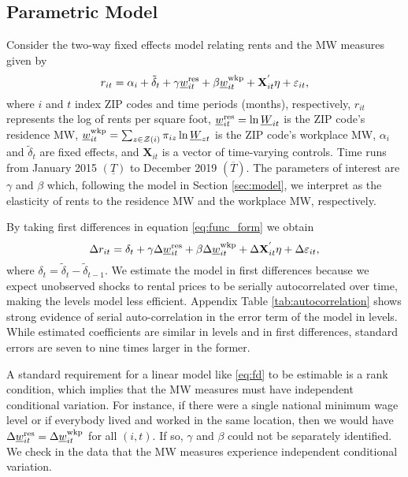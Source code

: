 \subsection{Parametric Model}

Consider the two-way fixed effects model relating rents and the MW measures
given by
\begin{equation} \label{eq:func_form}
    r_{it} = \alpha_i + \tilde{\delta}_t 
           + \gamma \underline{w}^{\text{res}}_{it} + \beta \underline{w}^{\text{wkp}}_{it}
           + \mathbf{X}^{'}_{it}\eta
           + \varepsilon_{it} ,
\end{equation}    
where
$i$ and $t$ index ZIP codes and time periods (months), respectively,
$r_{it}$ represents the log of rents per square foot,
$\underline{w}^{\text{res}}_{it} = \ln \underline{W}_{it}$ is the ZIP code's residence MW,
$\underline{w}^{\text{wkp}}_{it} = \sum_{z\in\mathcal{Z}(i)} \pi_{iz}\ln \underline{W}_{zt}$ is the ZIP code's 
workplace MW,
$\alpha_i$ and $\tilde{\delta}_t$ are fixed effects, and 
$\mathbf{X}_{it}$ is a vector of time-varying controls.
Time runs from January 2015 $\left(\underline{T}\right)$ 
to December 2019 $\left(\overline{T}\right)$.
The parameters of interest are $\gamma$ and $\beta$ which, 
following the model in Section \ref{sec:model}, 
we interpret as the elasticity of rents to the residence MW and the workplace MW, 
respectively.

By taking first differences in equation \eqref{eq:func_form} we obtain
\begin{equation}\label{eq:fd}
    \Delta r_{it} = \delta_t
                  + \gamma \Delta \underline{w}^{\text{res}}_{it} + \beta \Delta \underline{w}^{\text{wkp}}_{it}
                  + \Delta \mathbf{X}^{'}_{it}\eta
                  + \Delta \varepsilon_{it} ,
\end{equation}
where $\delta_t = \tilde{\delta}_t - \tilde{\delta}_{t-1}$.
We estimate the model in first differences because we expect unobserved shocks
to rental prices to be serially autocorrelated over time, making the levels
model less efficient.
Appendix Table \ref{tab:autocorrelation} shows strong evidence of serial 
auto-correlation in the error term of the model in levels.
While estimated coefficients are similar in levels and in first differences, 
standard errors are seven to nine times larger in the former.

A standard requirement for a linear model like \eqref{eq:fd} to be
estimable is a rank condition, which implies that the MW measures must have 
independent conditional variation.
For instance, if there were a single national minimum wage level or if everybody 
lived and worked in the same location, then we would have
$\Delta \underline{w}^{\text{res}}_{it} = \Delta \underline{w}^{\text{wkp}}_{it}$ for all $(i,t)$.
If so, $\gamma$ and $\beta$ could not be separately identified.
We check in the data that the MW measures experience independent conditional 
variation.

